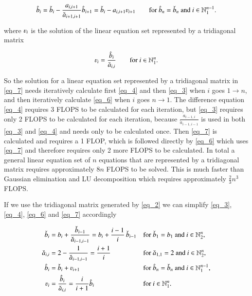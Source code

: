 \documentclass[11pt,english,a4paper]{article}
\begin{document}
\begin{flushleft}
\begin{align}
\hat b_i = \check b_i - \frac{a_{i,i+1}}{\check a_{i+1,i+1}} \hat b_{i+1} = \check b_i - a_{i,i+1} \varv_{i+1} \qquad \text{for $\hat b_n = \check b_n$ and $i\in\mathbb{N}_1^{n-1}$.}
\label{eq_6}
\end{align}

where $\varv_i$ is the solution of the linear equation set represented by a tridiagonal matrix

\begin{align}
\varv_i = \frac{\hat b_i}{\check a_{i,i}} \qquad \text{for $i\in\mathbb{N}_1^n$.}
\label{eq_7}
\end{align}

So the solution for a linear equation set represented by a tridiagonal matrix in \eqref{eq_7} needs iteratively calculate first \eqref{eq_4} and then \eqref{eq_3} when $i$ goes $1\to n$, and then iteratively calculate \eqref{eq_6} when $i$ goes $n\to 1$. The difference equation \eqref{eq_4} requires 3 FLOPS to be calculated for each iteration, but \eqref{eq_3} requires only 2 FLOPS to be calculated for each iteration, because $\frac{a_{i-1,i}}{\check a_{i-1,i-1}}$ is used in both \eqref{eq_3} and \eqref{eq_4} and needs only to be calculated once. Then \eqref{eq_7} is calculated and requires a 1 FLOP, which is followed directly by \eqref{eq_6} which uses \eqref{eq_7} and therefore requires only 2 more FLOPS to be calculated. In total a general linear equation set of $n$ equations that are represented by a tridiagonal matrix requires approximately $8n$ FLOPS to be solved. This is much faster than Gaussian elimination and LU decomposition which requires approximately $\frac{2}{3}n^3$ FLOPS. \linebreak

If we use the tridiagonal matrix generated by \eqref{eq_2} we can simplify \eqref{eq_3}, \eqref{eq_4}, \eqref{eq_6} and \eqref{eq_7} accordingly

\begin{align}
\check b_i &= b_i + \frac{\check b_{i-1}}{\check a_{i-1,i-1}} = b_i + \frac{i-1}{i} \, \check b_{i-1} && \text{for $\check b_1 = b_1$ and $i\in\mathbb{N}_2^n$,} 
\label{eq_8}
\\
\check a_{i,i} &= 2 - \frac{1}{\check a_{i-1,i-1}} = \frac{i+1}{i} && \text{for $\check a_{1,1} = 2$ and $i\in\mathbb{N}_2^n$,}
\label{eq_9}
\\
\hat b_i &= \check b_i + \varv_{i+1} && \text{for $\hat b_n = \check b_n$ and $i\in \mathbb{N}_1^{n-1}$,}
\label{eq_10}
\\
\varv_i &= \frac{\hat{b}_i}{\check{a}_{i,i}} = \frac{i}{i+1}\hat b_i && \text{for $i \in \mathbb{N}_1^n$.}
\label{eq_11}
\end{align}


\end{flushleft}
\end{document}
